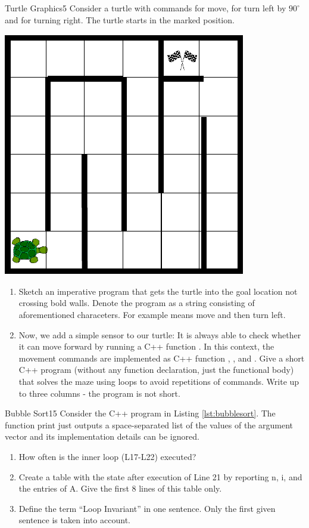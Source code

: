 \documentclass[twoside]{article}
\begin{document}
\begin{task}{Turtle Graphics}{5}{}
  Consider a turtle with commands  for move,  for turn left by $90^\circ$ and  for turning right. The turtle starts in the marked position.
  
  \centering\includegraphics[width=.4\textwidth]{gfx/turtlemaze.pdf}

  \begin{enumerate}
  \item{Sketch an imperative program that gets the turtle into the goal location not crossing bold walls. Denote the program as a string consisting of aforementioned characeters. For example  means move and then turn left.\vspace{2cm}}
  \item{
    Now, we add a simple sensor to our turtle: It is always able to check whether it can move forward by running a
    C++ function . In this context, the movement commands are implemented as C++ function , , and . Give a short C++ program (without any function declaration, just the functional body) that solves the maze using  loops to avoid repetitions of commands. Write up to three columns - the program is not short.
  }

  \end{enumerate}


\end{task}
\clearpage

\begin{task}{Bubble Sort}{15}{}
  Consider the C++ program in Listing \ref{lst:bubblesort}. The function print just outputs a space-separated list of the values of the argument vector and its implementation details can be ignored. 
  

  \begin{enumerate}
  \item{How often is the inner loop (L17-L22) executed?\vspace{2cm}}\clearpage
  \item{Create a table with the state after execution of Line 21 by reporting n, i, and the entries of A. Give the first 8 lines of this table only.\vspace{12cm}}
  \item{Define the term ``Loop Invariant'' in one sentence. Only the first given sentence is taken into account. \vspace{3cm}}
    \end{enumerate}
\end{task} %
\clearpage
\end{document}
